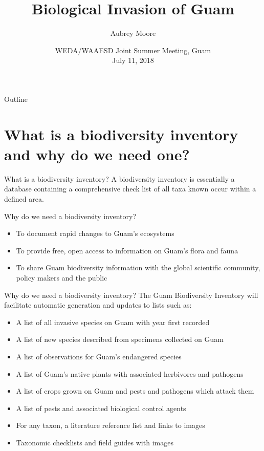 \documentclass[]{beamer}
\title[Biological Invasion of Guam]{Biological Invasion of Guam}
\author{Aubrey Moore}
\institute[University of Guam]{Cooperative Extension Service\\College of Natural and Applied Sciences\\University of Guam}
\date[]{WEDA/WAAESD Joint Summer Meeting, Guam\\July 11, 2018}
\begin{document}
\maketitle

\begin{frame}{Outline}
    \tableofcontents
\end{frame}

\section{What is a biodiversity inventory and why do we need one?}

\begin{frame}{What is a biodiversity inventory?}
A biodiversity inventory is essentially a database containing a comprehensive check list of all taxa known occur within a defined area.
\end{frame}

\begin{frame}{Why do we need a biodiversity inventory?}
  \begin{itemize}
      \item To document rapid changes to Guam's ecosystems
      \item To provide free, open access to information on Guam's flora and fauna
      \item To share Guam biodiversity information with the global scientific community, policy makers and the public
  \end{itemize}
\end{frame}

\begin{frame}{Why do we need a biodiversity inventory?}
The Guam Biodiversity Inventory will facilitate automatic generation and updates to lists such as:
\begin{itemize}
\item A list of all invasive species on Guam with year first recorded
\item A list of new species described from specimens collected on Guam 
\item A list of observations for Guam's endangered species
\item A list of Guam's native plants with associated herbivores and pathogens
\item A list of crops grown on Guam and pests and pathogens which attack them
\item A list of pests and associated biological control agents
\item For any taxon, a literature reference list and links to images
\item Taxonomic checklists and field guides with images
\end{itemize}
\end{frame}
\end{document}
